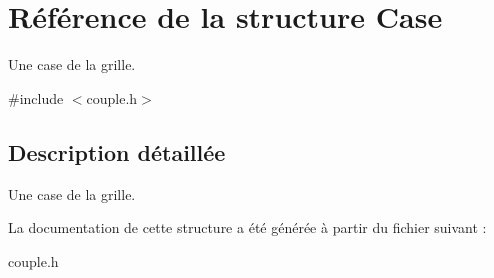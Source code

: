 \hypertarget{structCase}{\section{Référence de la structure Case}
\label{structCase}
}


Une case de la grille.  




{\ttfamily \#include $<$couple.\-h$>$}



\subsection{Description détaillée}
Une case de la grille. 

La documentation de cette structure a été générée à partir du fichier suivant \-:\begin{DoxyCompactItemize}
\item 
couple.\-h\end{DoxyCompactItemize}

